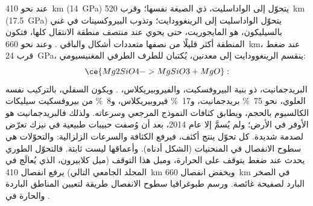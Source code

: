 عند نحو \qty{410}{km} (\qty{14}{GPa}) يتحوّل   إلى الواداسليت، ذي الصيغة نفسها؛ وقرب \qty{520}{km} (\qty{17.5}{GPa}) يتحوّل الواداسليت إلى الرينغوودايت؛ وتذوب البيروكسينات في  غني بالسيليكون، هو المايجوريت، حتى يحوي  عند منتصف منطقة الانتقال كلها، فتكون المنطقة أكثر قليلًا من نصفها متعددات أشكال  والباقي . وعند نحو \qty{660}{km}، عند ضغط قرب \qty{24}{GPa}، ينقسم الرينغوودايت إلى
معدنين، يُكتبان للطرف الطرفي المغنيسيومي:
\[
  \ce{Mg2SiO4 -> MgSiO3 + MgO}:
\]
البريدجمانيت،  ذو بنية البيروفسكيت، والفيروبيريكلاس، . ويكون  السفلي، بالتركيب نفسه  العلوي، نحو \qty{75}{\percent} بريدجمانيت، و\qty{17}{\percent} فيروبيريكلاس، و\qty{8}{\percent} من بيروفسكيت سيليكات الكالسيوم بالحجم، ويطابق كثافات النموذج المرجعي وسرعاته. ولذلك فالبريدجمانيت هو  الأوفر في الأرض؛ ولم يُسمَّ إلا عام 2014، بعد أن وُصفت حبيبات طبيعية في نيزك تعرّض لصدمة شديدة.
كل تحوّل ينتج  أكثف، فيرفع الكثافة والسرعات الزلزالية: والتحوّلات هي سطوح الانفصال في المنحنيات (الشكل أدناه). وأعماقها ليست ثابتة. فالتحوّل الطوري يحدث عند ضغط يتوقف على الحرارة، وميل هذا التوقف (ميل كلابيرون، الذي يُعالَج في المجلد الجامعي التالي) يرفع انفصال \qty{410}{km} ويخفض انفصال \qty{660}{km} في الصخر البارد لصفيحة غائصة. ورسم طبوغرافيا سطوح الانفصال طريقة لتعيين المناطق الباردة والحارة في .

